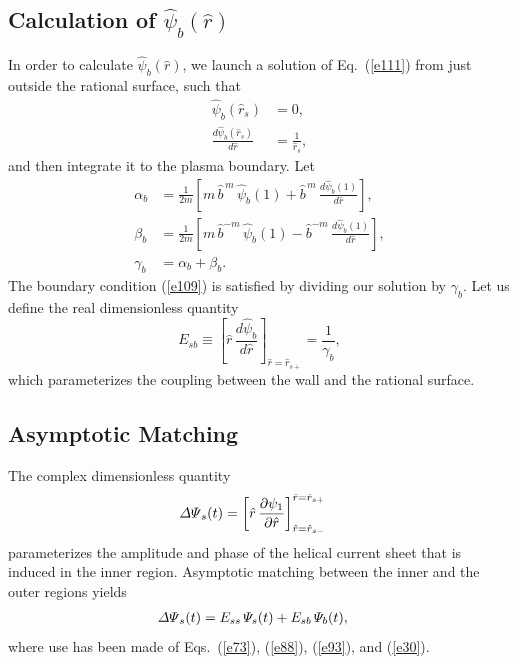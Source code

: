 \documentclass[12pt,prb,aps]{revtex4-1}
\begin{document}
\subsection{Calculation of $\hat{\psi}_b(\hat{r})$}\label{psib}
In order to calculate $\hat{\psi}_b(\hat{r})$, we launch a solution of Eq.~(\ref{e111}) from just outside the
rational surface, such that 
\begin{align}
\hat{\psi}_b(\hat{r}_s) &= 0,\\[0.5ex]
\frac{d\hat{\psi}_b(\hat{r}_s)}{d\hat{r}} &= \frac{1}{\hat{r}_s},
\end{align}
and then integrate it to  the plasma boundary. 
Let
\begin{align}
\alpha_b &= \frac{1}{2m}\left[m\,\hat{b}^{\,m}\,\hat{\psi}_b(1)+ \hat{b}^{\,m}  \,\frac{d\hat{\psi}_b(1)}{d\hat{r}}\right],\\[0.5ex]
\beta_b &= \frac{1}{2m}\left[m\,\hat{b}^{-m}\,\hat{\psi}_b(1)- \hat{b}^{-m}\,\frac{d\hat{\psi}_b(1)}{d\hat{r}}\right],\\[0.5ex]
\gamma_b&= \alpha_b+\beta_b.
\end{align}
The boundary condition (\ref{e109}) is satisfied by dividing our solution by $\gamma_b$. 
Let us define the real dimensionless quantity 
\begin{equation}\label{e93}
E_{sb} \equiv \left[\hat{r}\,\frac{d\hat{\psi}_b}{d\hat{r}}\right]_{\hat{r}=\hat{r}_{s+}} = \frac{1}{\gamma_b},
\end{equation}
which parameterizes the coupling between the wall and the rational surface. 

\subsection{Asymptotic Matching}
The complex dimensionless quantity 
\begin{align}\label{e30}
{\mit\Delta\Psi}_{s}(t) &= \left[\hat{r}\,\frac{\partial\psi_1}{\partial\hat{r}}\right]_{\hat{r}=\hat{r}_{s-}}^{\hat{r}=\hat{r}_{s+}}
\end{align}
parameterizes the amplitude and phase of the helical current sheet that is induced in the inner region. 
Asymptotic matching between the inner and the outer regions yields
\begin{align}\label{e31a}
{\mit\Delta\Psi}_{s}(t) &= E_{ss}\,{\mit\Psi}_s(t)+E_{sb}\,{\mit\Psi}_b(t),
\end{align}
where use has been made of Eqs.~(\ref{e73}), (\ref{e88}), (\ref{e93}), and (\ref{e30}). 
\end{document}
